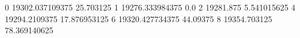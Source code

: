 0 19302.037109375 25.703125
1 19276.333984375 0.0
2 19281.875 5.541015625
4 19294.2109375 17.876953125
6 19320.427734375 44.09375
8 19354.703125 78.369140625

